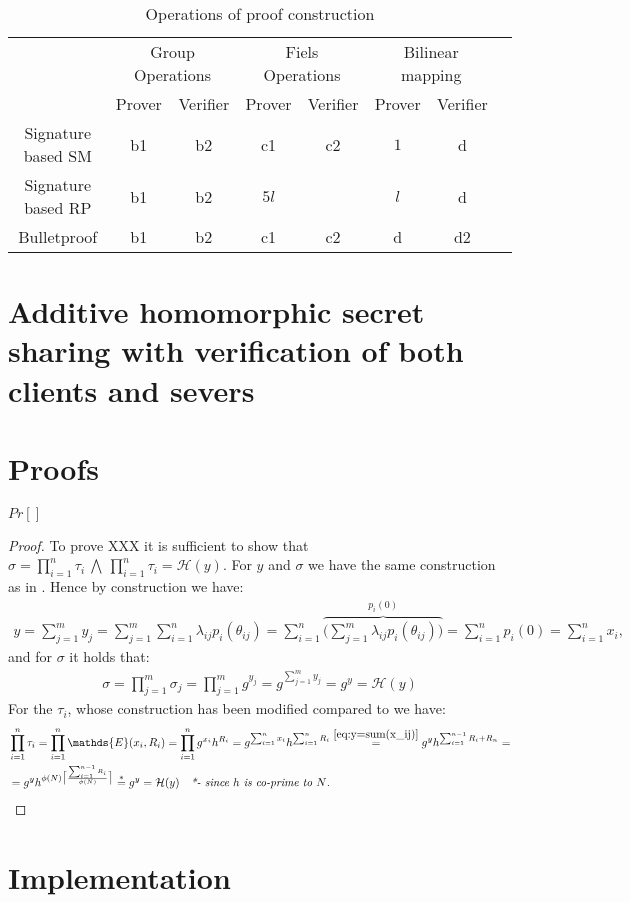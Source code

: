 \begin{table}[H]
\label{tab:compare}
\caption{Operations of proof construction}
\begin{tabular}{| *{8}{c|}}
			 \hline
    										&   \multicolumn{2}{c|}{Group Operations} 	& \multicolumn{2}{c|}{Fiels Operations}    & \multicolumn{2}{c|}{Bilinear mapping }        	\\
&  Prover & Verifier & Prover & Verifier&	Prover & Verifier 						 	\\ \hline
  Signature based SM  			&   b1  &   b2  											&   c1  &   c2    & $1$							 &d						\\ \hline 
  Signature based RP  	&   b1  &   b2 							&   $5l$ &     	 & $l$	& d	 										\\ \hline
  Bulletproof   						& b1  &   b2 												&   c1 &   c2     & d					&d2								\\ \hline	
\end{tabular}
 \end{table}
	
	

\section{Additive homomorphic secret sharing with verification of both clients and severs }


\section{Proofs}
\begin{thm}[Correctness]
$Pr[]$
\end{thm}
\begin{proof}
To prove XXX it is sufficient to show that $\sigma= \prod_{i=1}^n \tau_i \:\bigwedge\: \prod_{i=1}^n \tau_i = \mathcal{H}(y)$. For $y$ and $\sigma$ we have the same construction as in \cite{VAHSS}. Hence by construction we have:
\begin{align}
    \label{eq:y=sum(x_ij)}
    y = \sum_{j=1}^m y_j= \sum_{j=1}^m \sum_{i=1}^n \lambda_{ij}p_i(\theta_{ij}) = \sum_{i=1}^n \overbrace{ \Big (\sum_{j=1}^m \lambda_{ij}p_i(\theta_{ij}) \Big)}^{ p_i(0)} = \sum_{i=1}^n p_i(0) = \sum_{i=1}^n x_i,
\end{align}
and for $\sigma$ it holds that:
\begin{align*}
    \sigma = \prod_{j=1}^m \sigma_j = \prod_{j=1}^m g^{y_j} = g^{\sum_{j=1}^my_j} =g^y = \mathcal{H}(y)
\end{align*}
For the $\tau_i$, whose construction has been modified compared to \cite{VAHSS} we have:
\begin{align*}
    &\prod_{i=1}^n \tau_i = \prod_{i=1}^n \mathds{E}(x_i,R_i)= \prod_{i=1}^n g^{x_i}h^{R_i} = g^{\sum_{i=1}^n x_i } h^{\sum_{i=1}^n R_i} \overset{\eqref{eq:y=sum(x_ij)}}{=} g^y h^{\sum_{i=1}^{n-1} R_i+R_n} = \\ 
    &= g^y h^{ \phi(N)\big\lceil \frac{\sum_{i=1}^{n-1}R_i}{\phi(N) }\big\rceil}  \overset{*}{=} g^y = \mathcal{H}(y) \quad \textit{*- since $h$ is co-prime to $N$.}
\end{align*}

\end{proof}

\section{Implementation}
